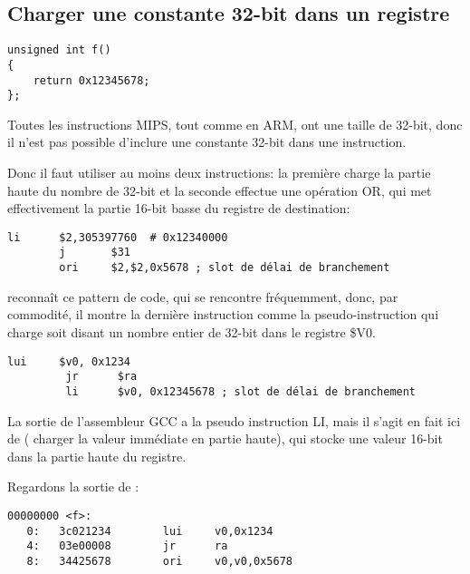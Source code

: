 ﻿\subsection{Charger une constante 32-bit dans un registre}
\label{MIPS_big_constants}

\begin{lstlisting}[style=customc]
unsigned int f()
{
	return 0x12345678;
};
\end{lstlisting}

Toutes les instructions MIPS, tout comme en ARM, ont une taille de 32-bit, donc il
n'est pas possible d'inclure une constante 32-bit dans une instruction.

Donc il faut utiliser au moins deux instructions:
la première charge la partie haute du nombre de 32-bit et la seconde effectue une
opération OR, qui met effectivement la partie 16-bit basse du registre de destination:

\begin{lstlisting}[caption=GCC 4.4.5 -O3 (\assemblyOutput),style=customasmMIPS]
        li      $2,305397760  # 0x12340000
        j       $31
        ori     $2,$2,0x5678 ; slot de délai de branchement
\end{lstlisting}

\IDA reconnaît ce pattern de code, qui se rencontre fréquemment, donc, par commodité,
il montre la dernière instruction  comme la pseudo-instruction  qui
charge soit disant un nombre entier de 32-bit dans le registre \$V0. %


\begin{lstlisting}[caption=GCC 4.4.5 -O3 (IDA),style=customasmMIPS]
         lui     $v0, 0x1234
         jr      $ra
         li      $v0, 0x12345678 ; slot de délai de branchement
\end{lstlisting}

La sortie de l'assembleur GCC a la pseudo instruction LI, mais il s'agit en fait
ici de  ( charger la valeur immédiate en partie
haute), qui stocke une valeur 16-bit dans la partie haute du registre.

Regardons la sortie de :

\begin{lstlisting}[caption=objdump,style=customasmMIPS]
00000000 <f>:
   0:   3c021234        lui     v0,0x1234
   4:   03e00008        jr      ra
   8:   34425678        ori     v0,v0,0x5678
\end{lstlisting}

